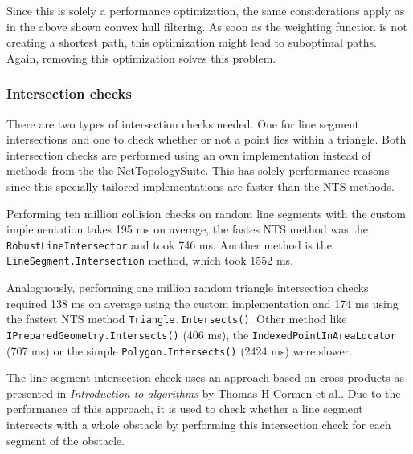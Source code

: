 			Since this is solely a performance optimization, the same considerations apply as in the above shown convex hull filtering.
			As soon as the weighting function is not creating a shortest path, this optimization might lead to suboptimal paths.
			Again, removing this optimization solves this problem.
			
		\subsubsection{Intersection checks}
		\label{subsubsec:intersection-checks}
			
			There are two types of intersection checks needed.
			One for line segment intersections and one to check whether or not a point lies within a triangle.
			Both intersection checks are performed using an own implementation instead of methods from the the NetTopologySuite.
			This has solely performance reasons since this specially tailored implementations are faster than the NTS methods.
			
			Performing ten million collision checks on random line segments with the custom implementation takes 195 ms on average, the fastes NTS method was the \texttt{RobustLineIntersector} and took 746 ms.
			Another method is the \texttt{LineSegment.Intersection} method, which took 1552 ms.
			
			Analoguously, performing one million random triangle intersection checks required 138 ms on average using the custom implementation and 174 ms using the fastest NTS method \texttt{Triangle.Intersects()}.
			Other method like \texttt{IPreparedGeometry.Intersects()} (406 ms), the \texttt{IndexedPointInAreaLocator} (707 ms) or the simple \texttt{Polygon.Intersects()} (2424 ms) were slower.
			
			The line segment intersection check uses an approach based on cross products as presented in \emph{Introduction to algorithms} by Thomas H Cormen et al.\cite[1018]{cormen-introduction-to-alg}.
			Due to the performance of this approach, it is used to check whether a line segment intersects with a whole obstacle by performing this intersection check for each segment of the obstacle.
			

